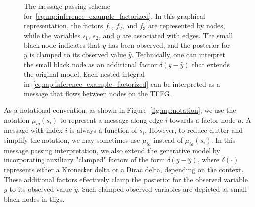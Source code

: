 \begin{figure}
  \centering
  \resizebox{0.9\textwidth}{!}{}
  \caption{The message passing scheme for~\eqref{eq:mp:inference_example_factorized}.
    In this graphical representation, the factors $f_1$, $f_2$, and $f_3$ are represented by
    nodes, while the variables $s_1$, $s_2$, and $y$ are associated with edges.
    The small black node indicates that $y$ has been observed, and the posterior for $y$ is
    clamped to its observed value $\hat{y}$.
    Technically, one can interpret the small black node as an additional factor $\delta(y -
      \hat{y})$ that extends the original model.
    Each nested integral in~\eqref{eq:mp:inference_example_factorized} can be interpreted as a
    message that flows between nodes on the TFFG.
  }
  \label{fig:mp:inference_example}
\end{figure}

As a notational convention, as shown in Figure~\ref{fig:mp:notation}, we use the notation
$\mu_{ia}(s_i)$ to represent a message along edge $i$ towards a factor node $a$.
A message with index $i$ is always a function of $s_i$.
However, to reduce clutter and simplify the notation, we may sometimes use $\mu_{ia}$ instead
of $\mu_{ia}(s_i)$.
In this message passing interpretation, we also extend the generative model by incorporating
auxiliary "clamped" factors of the form $\delta(y - \hat{y})$, where $\delta(\cdot)$
represents either a Kronecker delta or a Dirac delta, depending on the context.
These additional factors effectively clamp the posterior for the observed variable $y$ to its
observed value $\hat{y}$.
Such clamped observed variables are depicted as small black nodes in \acp{tffg}.

